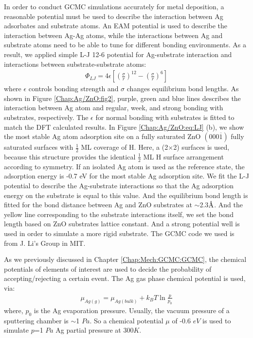 In order to conduct \ac{GCMC} simulations accurately for metal deposition, a reasonable potential must be used to describe the interaction between Ag adsorbates and substrate atoms. An \ac{EAM} potential \cite{williams2016modeling} is used to describe the interaction between Ag-Ag atoms, while the interactions between Ag and substrate atoms need to be able to tune for different bonding environments. As a result, we applied simple \ac{L-J} 12-6 potential \cite{jones1924determination} for Ag-substrate interaction and interactions between substrate-substrate atoms:
\begin{align}
 \Phi_{LJ} = 4\epsilon \left[ (\frac{\sigma}{r})^{12} - (\frac{\sigma}{r})^6\right]
 \label{Chap:Ag/ZnO:eq:LJ}
\end{align}
where $\epsilon$ controls bonding strength and $\sigma$ changes equilibrium bond lengths. As shown in Figure \ref{Chap:Ag/ZnO:fig2}, purple, green and blue lines describes the interaction between Ag atom and regular, week, and strong bonding with substrates, respectively. The $\epsilon$ for normal bonding with substrates is fitted to match the \ac{DFT} calculated results. In Figure \ref{Chap:Ag/ZnO:eq:LJ} (b), we show the most stable Ag atom adsorption site on a fully saturated ZnO $(000\overline{1})$ fully saturated surfaces with $\frac{1}{2}$ ML coverage of H. Here, a (2$\times$2) surfaces is used, because this structure provides the identical $\frac{1}{2}$ ML H surface arrangement according to symmetry. If an isolated Ag atom is used as the reference state, the adsorption energy is -0.7 eV for the most stable Ag adsorption site. We fit the \ac{L-J} potential to describe the Ag-substrate interactions so that the Ag adsorption energy on the substrate is equal to this value. And the equilibrium bond length is fitted for the bond distance between Ag and ZnO substrates at $\sim$2.3$\mbox{\normalfont\AA}$. And the yellow line corresponding to the substrate interactions itself, we set the bond length based on ZnO substrates lattice constant. And a strong potential well is used in order to simulate a more rigid substrate. The \ac{GCMC} code we used is from J. Li's Group in MIT\cite{sina2017mapp}.

As we previously discussed in Chapter \ref{Chap:Mech:GCMC:GCMC}, the chemical potentials of elements of interest are used to decide the probability of accepting/rejecting a certain event. The Ag gas phase chemical potential is used, via:
\begin{align}
 \mu_{Ag(g)} = \mu_{Ag(bulk)} + k_{B}T\ln{\frac{p}{p_0}}
 \label{Chap:Ag/ZnO:eq:mu_Ag}
\end{align}
where, $p_0$ is the Ag evaporation pressure. Usually, the vacuum pressure of a sputtering chamber is $\sim$1 $Pa$. So a chemical potential $\mu$ of -0.6 $eV$ is used to simulate $p$=1 $Pa$ Ag partial pressure at 300$K$.


